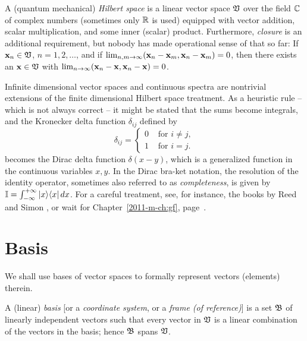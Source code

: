 A (quantum mechanical) {\em Hilbert space}  is a linear
vector space ${\frak V}$ over the field ${\Bbb C}$ of complex numbers
(sometimes only ${\Bbb R}$ is used)
equipped with vector addition, scalar multiplication, and some inner (scalar) product.
Furthermore, {\em closure} is an additional requirement,
but nobody has made operational sense of that so far:
If ${\bf x}_n\in {\frak V}$, $n=1,2,\ldots$, and if $\lim_{n,m\rightarrow
\infty} ({\bf x}_n-{\bf x}_m,{\bf x}_n-{\bf x}_m)=0$,
then there exists an ${\bf x}\in {\frak V}$ with
$\lim_{n\rightarrow \infty} ({\bf x}_n-{\bf x},{\bf x}_n-{\bf x})=0$.





Infinite dimensional vector spaces and continuous spectra are nontrivial
extensions of the finite
dimensional Hilbert space treatment. As a heuristic rule -- which is not
always correct -- it might be
stated that the sums become integrals, and the Kronecker delta function
$\delta_{ij}$ defined by
\begin{equation}
\delta_{ij} =\begin{cases}
0  &\text{ for }i\neq j , \\
1  &\text{ for }i = j.
\end{cases}
\end{equation}
becomes the Dirac delta function $\delta (x-y)$, which is a
generalized function in the continuous variables $x,y$.
In the Dirac bra-ket notation, the resolution of the identity operator,
sometimes also referred to as {\em completeness}, is given by
${\Bbb I} = \int_{-\infty}^{+\infty} \vert x\rangle \langle  x\vert \, dx$.
For a careful treatment, see, for instance,
the books by
Reed and Simon \cite{reed-sim1,reed-sim2},
or wait for Chapter~\ref{2011-m-ch:gf}, page~\pageref{2011-m-ch:gf}.


\section{Basis}
\label{2012-m-ch-fdvs-Basis}

We shall use bases of vector spaces to formally represent vectors (elements) therein.

A (linear) {\em basis}
[or a {\em coordinate system}, or a {\em frame (of reference)}]
is a set    $\frak B$
of linearly independent vectors
such that every vector
in $\frak V$ is a linear combination of the vectors in the basis; hence
$\frak B$ spans $\frak V$.

